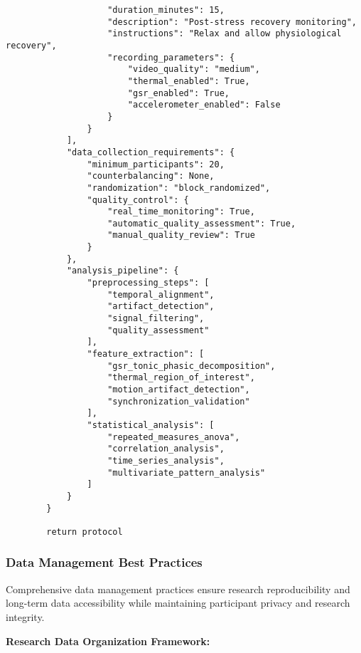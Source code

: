 \documentclass[12pt,a4paper]{article}
\begin{document}
\begin{verbatim}
                    "duration_minutes": 15,
                    "description": "Post-stress recovery monitoring",
                    "instructions": "Relax and allow physiological recovery",
                    "recording_parameters": {
                        "video_quality": "medium",
                        "thermal_enabled": True,
                        "gsr_enabled": True,
                        "accelerometer_enabled": False
                    }
                }
            ],
            "data_collection_requirements": {
                "minimum_participants": 20,
                "counterbalancing": None,
                "randomization": "block_randomized",
                "quality_control": {
                    "real_time_monitoring": True,
                    "automatic_quality_assessment": True,
                    "manual_quality_review": True
                }
            },
            "analysis_pipeline": {
                "preprocessing_steps": [
                    "temporal_alignment",
                    "artifact_detection",
                    "signal_filtering",
                    "quality_assessment"
                ],
                "feature_extraction": [
                    "gsr_tonic_phasic_decomposition",
                    "thermal_region_of_interest",
                    "motion_artifact_detection",
                    "synchronization_validation"
                ],
                "statistical_analysis": [
                    "repeated_measures_anova",
                    "correlation_analysis",
                    "time_series_analysis",
                    "multivariate_pattern_analysis"
                ]
            }
        }
        
        return protocol
\end{verbatim}

\subsubsection{Data Management Best Practices}

Comprehensive data management practices ensure research reproducibility and long-term data accessibility while
maintaining participant privacy and research integrity.

\textbf{Research Data Organization Framework:}
\end{document}

